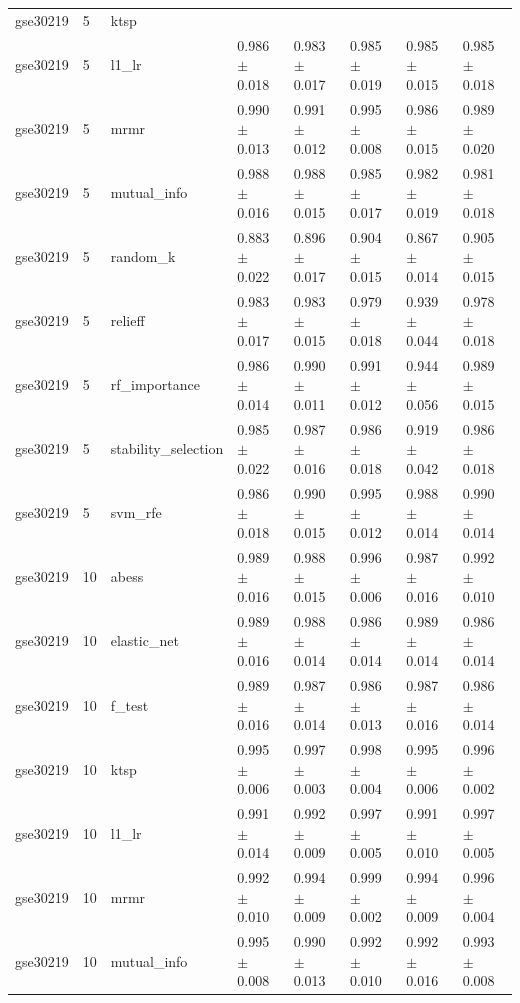 \begin{table}[t]
\begin{tabular}{llllllll}
    gse30219 & 5 & ktsp &  &  &  &  &  \\
    gse30219 & 5 & l1\_lr & 0.986 $\pm$ 0.018 & 0.983 $\pm$ 0.017 & 0.985 $\pm$ 0.019 & 0.985 $\pm$ 0.015 & 0.985 $\pm$ 0.018 \\
    gse30219 & 5 & mrmr & 0.990 $\pm$ 0.013 & 0.991 $\pm$ 0.012 & 0.995 $\pm$ 0.008 & 0.986 $\pm$ 0.015 & 0.989 $\pm$ 0.020 \\
    gse30219 & 5 & mutual\_info & 0.988 $\pm$ 0.016 & 0.988 $\pm$ 0.015 & 0.985 $\pm$ 0.017 & 0.982 $\pm$ 0.019 & 0.981 $\pm$ 0.018 \\
    gse30219 & 5 & random\_k & 0.883 $\pm$ 0.022 & 0.896 $\pm$ 0.017 & 0.904 $\pm$ 0.015 & 0.867 $\pm$ 0.014 & 0.905 $\pm$ 0.015 \\
    gse30219 & 5 & relieff & 0.983 $\pm$ 0.017 & 0.983 $\pm$ 0.015 & 0.979 $\pm$ 0.018 & 0.939 $\pm$ 0.044 & 0.978 $\pm$ 0.018 \\
    gse30219 & 5 & rf\_importance & 0.986 $\pm$ 0.014 & 0.990 $\pm$ 0.011 & 0.991 $\pm$ 0.012 & 0.944 $\pm$ 0.056 & 0.989 $\pm$ 0.015 \\
    gse30219 & 5 & stability\_selection & 0.985 $\pm$ 0.022 & 0.987 $\pm$ 0.016 & 0.986 $\pm$ 0.018 & 0.919 $\pm$ 0.042 & 0.986 $\pm$ 0.018 \\
    gse30219 & 5 & svm\_rfe & 0.986 $\pm$ 0.018 & 0.990 $\pm$ 0.015 & 0.995 $\pm$ 0.012 & 0.988 $\pm$ 0.014 & 0.990 $\pm$ 0.014 \\
    gse30219 & 10 & abess & 0.989 $\pm$ 0.016 & 0.988 $\pm$ 0.015 & 0.996 $\pm$ 0.006 & 0.987 $\pm$ 0.016 & 0.992 $\pm$ 0.010 \\
    gse30219 & 10 & elastic\_net & 0.989 $\pm$ 0.016 & 0.988 $\pm$ 0.014 & 0.986 $\pm$ 0.014 & 0.989 $\pm$ 0.014 & 0.986 $\pm$ 0.014 \\
    gse30219 & 10 & f\_test & 0.989 $\pm$ 0.016 & 0.987 $\pm$ 0.014 & 0.986 $\pm$ 0.013 & 0.987 $\pm$ 0.016 & 0.986 $\pm$ 0.014 \\
    gse30219 & 10 & ktsp & 0.995 $\pm$ 0.006 & 0.997 $\pm$ 0.003 & 0.998 $\pm$ 0.004 & 0.995 $\pm$ 0.006 & 0.996 $\pm$ 0.002 \\
    gse30219 & 10 & l1\_lr & 0.991 $\pm$ 0.014 & 0.992 $\pm$ 0.009 & 0.997 $\pm$ 0.005 & 0.991 $\pm$ 0.010 & 0.997 $\pm$ 0.005 \\
    gse30219 & 10 & mrmr & 0.992 $\pm$ 0.010 & 0.994 $\pm$ 0.009 & 0.999 $\pm$ 0.002 & 0.994 $\pm$ 0.009 & 0.996 $\pm$ 0.004 \\
    gse30219 & 10 & mutual\_info & 0.995 $\pm$ 0.008 & 0.990 $\pm$ 0.013 & 0.992 $\pm$ 0.010 & 0.992 $\pm$ 0.016 & 0.993 $\pm$ 0.008 \\

\end{tabular}
\end{table}
